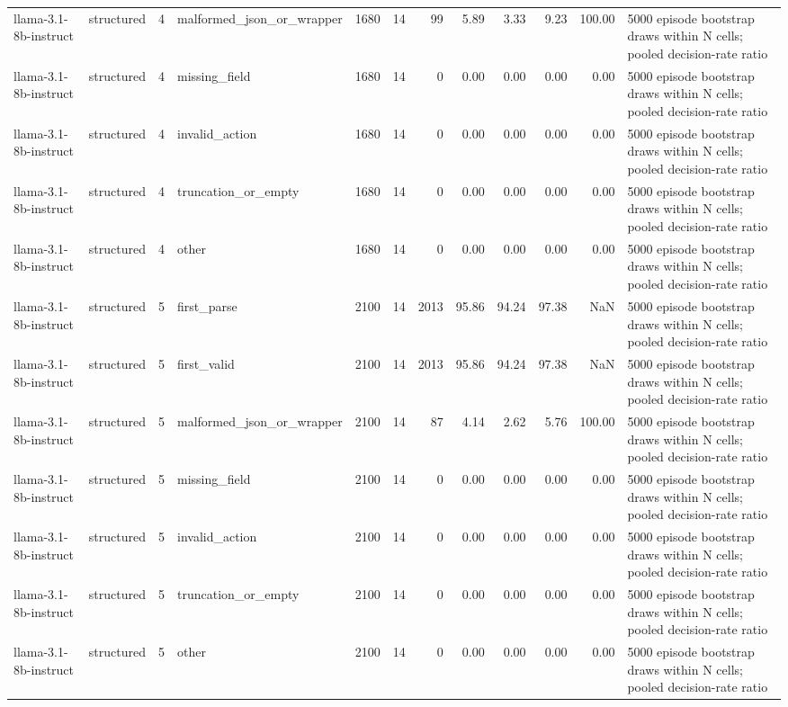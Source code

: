 \begin{tabular}{llllrrrrrrrl}
llama-3.1-8b-instruct & structured & 4 & malformed\_json\_or\_wrapper & 1680 & 14 & 99 & 5.89 & 3.33 & 9.23 & 100.00 & 5000 episode bootstrap draws within N cells; pooled decision-rate ratio \\
llama-3.1-8b-instruct & structured & 4 & missing\_field & 1680 & 14 & 0 & 0.00 & 0.00 & 0.00 & 0.00 & 5000 episode bootstrap draws within N cells; pooled decision-rate ratio \\
llama-3.1-8b-instruct & structured & 4 & invalid\_action & 1680 & 14 & 0 & 0.00 & 0.00 & 0.00 & 0.00 & 5000 episode bootstrap draws within N cells; pooled decision-rate ratio \\
llama-3.1-8b-instruct & structured & 4 & truncation\_or\_empty & 1680 & 14 & 0 & 0.00 & 0.00 & 0.00 & 0.00 & 5000 episode bootstrap draws within N cells; pooled decision-rate ratio \\
llama-3.1-8b-instruct & structured & 4 & other & 1680 & 14 & 0 & 0.00 & 0.00 & 0.00 & 0.00 & 5000 episode bootstrap draws within N cells; pooled decision-rate ratio \\
llama-3.1-8b-instruct & structured & 5 & first\_parse & 2100 & 14 & 2013 & 95.86 & 94.24 & 97.38 & NaN & 5000 episode bootstrap draws within N cells; pooled decision-rate ratio \\
llama-3.1-8b-instruct & structured & 5 & first\_valid & 2100 & 14 & 2013 & 95.86 & 94.24 & 97.38 & NaN & 5000 episode bootstrap draws within N cells; pooled decision-rate ratio \\
llama-3.1-8b-instruct & structured & 5 & malformed\_json\_or\_wrapper & 2100 & 14 & 87 & 4.14 & 2.62 & 5.76 & 100.00 & 5000 episode bootstrap draws within N cells; pooled decision-rate ratio \\
llama-3.1-8b-instruct & structured & 5 & missing\_field & 2100 & 14 & 0 & 0.00 & 0.00 & 0.00 & 0.00 & 5000 episode bootstrap draws within N cells; pooled decision-rate ratio \\
llama-3.1-8b-instruct & structured & 5 & invalid\_action & 2100 & 14 & 0 & 0.00 & 0.00 & 0.00 & 0.00 & 5000 episode bootstrap draws within N cells; pooled decision-rate ratio \\
llama-3.1-8b-instruct & structured & 5 & truncation\_or\_empty & 2100 & 14 & 0 & 0.00 & 0.00 & 0.00 & 0.00 & 5000 episode bootstrap draws within N cells; pooled decision-rate ratio \\
llama-3.1-8b-instruct & structured & 5 & other & 2100 & 14 & 0 & 0.00 & 0.00 & 0.00 & 0.00 & 5000 episode bootstrap draws within N cells; pooled decision-rate ratio \\

\end{tabular}

